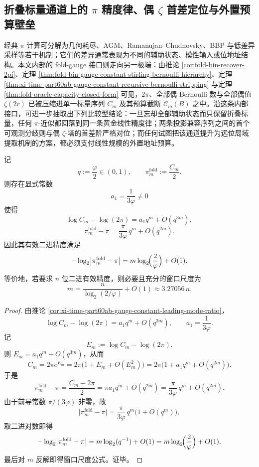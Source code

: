 \subsection{折叠标量通道上的 \texorpdfstring{$\pi$}{pi} 精度律、偶 \texorpdfstring{$\zeta$}{zeta} 首差定位与外置预算壁垒}\label{subsec:conclusion-foldgauge-pi-evenzeta-budget-comparison}
经典 \(\pi\) 计算可分解为几何耗尽、AGM、Ramanujan--Chudnovsky、BBP 与低差异采样等若干机制；它们的差异通常表现为不同的辅助状态、模性输入或位地址结构。本文内部的 fold-gauge 接口则走向另一极端：由推论 \ref{cor:fold-bin-recover-2pi}、定理 \ref{thm:fold-bin-gauge-constant-stirling-bernoulli-hierarchy}、定理 \ref{thm:xi-time-part60ab-gauge-constant-recursive-bernoulli-stripping} 与定理 \ref{thm:fold-oracle-capacity-closed-form} 可见，\(2\pi\)、全部偶 Bernoulli 数与全部偶值 \(\zeta(2r)\) 已被压缩进单一标量序列 \(C_m\) 及其预算截断 \(\mathcal C_m(B)\) 之中。沿这条内部接口，可进一步抽取出下列比较型结论：一旦忘却全部辅助状态而只保留折叠标量，任何 \(\pi\)-近似都回落到同一条黄金线性精度律；两条投影兼容序列之间的首个可观测分歧则与偶 \(\zeta\)-塔的首差阶严格对位；而任何试图把该通道提升为远位局域提取机制的方案，都必须支付线性规模的外置地址预算。

\begin{theorem}[折叠标量通道的黄金线性精度律]\label{thm:conclusion-foldgauge-pi-golden-linear-law}
记
\[
q:=\frac{\varphi}{2}\in(0,1),
\qquad
\pi_m^{\mathrm{fold}}:=\frac{C_m}{2}.
\]
则存在显式常数
\[
a_1=\frac{1}{3\varphi}\neq 0
\]
使得
\[
\log C_m-\log(2\pi)=a_1 q^m+O(q^{3m}),
\]
\[
\pi_m^{\mathrm{fold}}-\pi=\frac{\pi}{3\varphi}\,q^m+O(q^{2m}).
\]
因此其有效二进精度满足
\[
-\log_2\bigl|\pi_m^{\mathrm{fold}}-\pi\bigr|
=
m\log_2\!\Bigl(\frac{2}{\varphi}\Bigr)+O(1).
\]
等价地，若要求 \(n\) 位二进有效精度，则必要且充分的窗口尺度为
\[
m=
\frac{n}{\log_2(2/\varphi)}+O(1)
\approx 3.27056\,n.
\]
\end{theorem}
\begin{proof}
由推论 \ref{cor:xi-time-part60ab-gauge-constant-leading-mode-ratio}，
\[
\log C_m-\log(2\pi)=a_1 q^m+O(q^{3m}),
\qquad
a_1=\frac{1}{3\varphi}.
\]
记
\[
E_m:=\log C_m-\log(2\pi).
\]
则 \(E_m=a_1 q^m+O(q^{3m})\)，从而
\[
C_m
=
2\pi e^{E_m}
=
2\pi\bigl(1+E_m+O(E_m^2)\bigr)
=
2\pi\bigl(1+a_1 q^m+O(q^{2m})\bigr).
\]
于是
\[
\pi_m^{\mathrm{fold}}-\pi
=
\frac{C_m-2\pi}{2}
=
\pi a_1 q^m+O(q^{2m})
=
\frac{\pi}{3\varphi}\,q^m+O(q^{2m}).
\]
由于前导常数 \(\pi/(3\varphi)\) 非零，故
\[
\bigl|\pi_m^{\mathrm{fold}}-\pi\bigr|
=
\frac{\pi}{3\varphi}\,q^m\bigl(1+O(q^m)\bigr),
\]
取二进对数即得
\[
-\log_2\bigl|\pi_m^{\mathrm{fold}}-\pi\bigr|
=
m\log_2(q^{-1})+O(1)
=
m\log_2\!\Bigl(\frac{2}{\varphi}\Bigr)+O(1).
\]
最后对 \(m\) 反解即得窗口尺度公式。证毕。
\end{proof}

